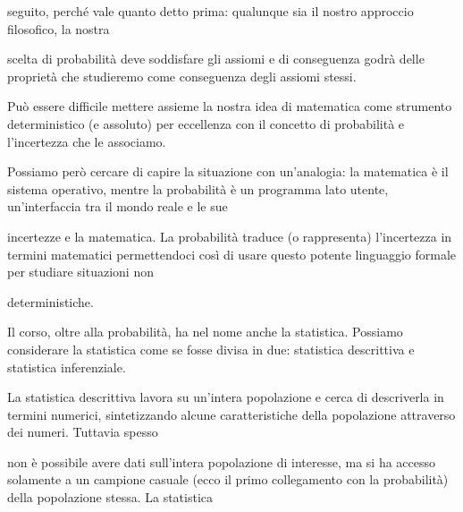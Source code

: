 \documentclass[a4paper,portrait,12pt]{article}
\begin{document}
\begin{flushleft}
seguito, perch\'{e} vale quanto detto prima: qualunque sia il nostro approccio filosofico, la nostra
\end{flushleft}


\begin{flushleft}
scelta di probabilit\`{a} deve soddisfare gli assiomi e di conseguenza godr\`{a} delle propriet\`{a} che studieremo come conseguenza degli assiomi stessi.
\end{flushleft}


\begin{flushleft}
Pu\`{o} essere difficile mettere assieme la nostra idea di matematica come strumento deterministico (e assoluto) per eccellenza con il concetto di probabilit\`{a} e l'incertezza che le associamo.
\end{flushleft}


\begin{flushleft}
Possiamo per\`{o} cercare di capire la situazione con un'analogia: la matematica \`{e} il sistema operativo, mentre la probabilit\`{a} \`{e} un programma lato utente, un'interfaccia tra il mondo reale e le sue
\end{flushleft}


\begin{flushleft}
incertezze e la matematica. La probabilit\`{a} traduce (o rappresenta) l'incertezza in termini matematici permettendoci così di usare questo potente linguaggio formale per studiare situazioni non
\end{flushleft}


\begin{flushleft}
deterministiche.
\end{flushleft}


\begin{flushleft}
Il corso, oltre alla probabilit\`{a}, ha nel nome anche la statistica. Possiamo considerare la statistica come se fosse divisa in due: statistica descrittiva e statistica inferenziale.
\end{flushleft}


\begin{flushleft}
La statistica descrittiva lavora su un'intera popolazione e cerca di descriverla in termini numerici, sintetizzando alcune caratteristiche della popolazione attraverso dei numeri. Tuttavia spesso
\end{flushleft}


\begin{flushleft}
non \`{e} possibile avere dati sull'intera popolazione di interesse, ma si ha accesso solamente a un campione casuale (ecco il primo collegamento con la probabilit\`{a}) della popolazione stessa. La statistica
\end{flushleft}
\end{document}

